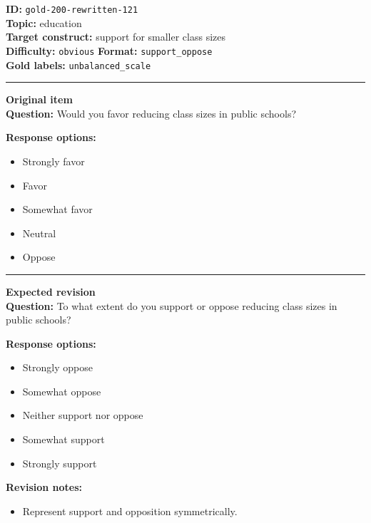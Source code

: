 \documentclass[10pt,a4paper]{article}
\newcommand{\sectionline}{\vspace{0.15em}\hrule\vspace{0.35em}}
\begin{document}
\begin{tcolorbox}[colframe=FlawRed,colback=white,colbacktitle=FlawRed!9,coltitle=black,title={Item 121\hfill Flawed item}]
\textbf{ID:} \texttt{gold-200-rewritten-121}\\
\textbf{Topic:} education\\
\textbf{Target construct:} support for smaller class sizes\\
\textbf{Difficulty:} \texttt{obvious} \quad \textbf{Format:} \texttt{support\_oppose}\\
\textbf{Gold labels:} \texttt{unbalanced\_scale}\\
\sectionline
\textbf{Original item}\\
\textbf{Question:} Would you favor reducing class sizes in public schools?
\par\textbf{Response options:}
\begin{itemize}
\item Strongly favor
\item Favor
\item Somewhat favor
\item Neutral
\item Oppose
\end{itemize}
\sectionline
\textbf{Expected revision}\\
\textbf{Question:} To what extent do you support or oppose reducing class sizes in public schools?
\par\textbf{Response options:}
\begin{itemize}
\item Strongly oppose
\item Somewhat oppose
\item Neither support nor oppose
\item Somewhat support
\item Strongly support
\end{itemize}
\par\textbf{Revision notes:}
\begin{itemize}
\item Represent support and opposition symmetrically.
\end{itemize}
\end{tcolorbox}
\end{document}
